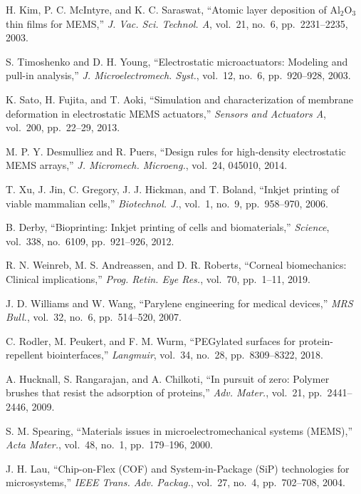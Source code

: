 \documentclass[conference]{IEEEtran}
\begin{document}
\begin{thebibliography}{99}

H. Kim, P. C. McIntyre, and K. C. Saraswat,
``Atomic layer deposition of Al$_2$O$_3$ thin films for MEMS,''
\emph{J. Vac. Sci. Technol. A}, vol.~21, no.~6, pp.~2231--2235, 2003.

S. Timoshenko and D. H. Young,
``Electrostatic microactuators: Modeling and pull-in analysis,''
\emph{J. Microelectromech. Syst.}, vol.~12, no.~6, pp.~920--928, 2003.

K. Sato, H. Fujita, and T. Aoki,
``Simulation and characterization of membrane deformation in electrostatic MEMS actuators,''
\emph{Sensors and Actuators A}, vol.~200, pp.~22--29, 2013.

M. P. Y. Desmulliez and R. Puers,
``Design rules for high-density electrostatic MEMS arrays,''
\emph{J. Micromech. Microeng.}, vol.~24, 045010, 2014.

T. Xu, J. Jin, C. Gregory, J. J. Hickman, and T. Boland,
``Inkjet printing of viable mammalian cells,''
\emph{Biotechnol. J.}, vol.~1, no.~9, pp.~958--970, 2006.

B. Derby,
``Bioprinting: Inkjet printing of cells and biomaterials,''
\emph{Science}, vol.~338, no.~6109, pp.~921--926, 2012.

R. N. Weinreb, M. S. Andreassen, and D. R. Roberts,
``Corneal biomechanics: Clinical implications,''
\emph{Prog. Retin. Eye Res.}, vol.~70, pp.~1--11, 2019.

J. D. Williams and W. Wang,
``Parylene engineering for medical devices,''
\emph{MRS Bull.}, vol.~32, no.~6, pp.~514--520, 2007.

C. Rodler, M. Peukert, and F. M. Wurm,
``PEGylated surfaces for protein-repellent biointerfaces,''
\emph{Langmuir}, vol.~34, no.~28, pp.~8309--8322, 2018.

A. Hucknall, S. Rangarajan, and A. Chilkoti,
``In pursuit of zero: Polymer brushes that resist the adsorption of proteins,''
\emph{Adv. Mater.}, vol.~21, pp.~2441--2446, 2009.

S. M. Spearing,
``Materials issues in microelectromechanical systems (MEMS),''
\emph{Acta Mater.}, vol.~48, no.~1, pp.~179--196, 2000.

J. H. Lau,
``Chip-on-Flex (COF) and System-in-Package (SiP) technologies for microsystems,''
\emph{IEEE Trans. Adv. Packag.}, vol.~27, no.~4, pp.~702--708, 2004.

\end{thebibliography}
\end{document}

